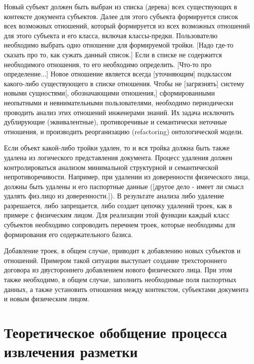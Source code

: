 \documentclass[utf8]{../IncArticle}
\newcommand{\e}[2][fcolor]{\textcolor{pcolor}{[}\textcolor{#1}{#2}\textcolor{pcolor}{]}}
\begin{document}
Новый субъект должен быть выбран из списка (дерева) всех существующих
в контексте документа субъектов.  Далее для этого субъекта формируется
список всех возможных отношений, который формируется из всех возможных
отношений для этого субъекта и его класса, включая классы-предки.
Пользователю необходимо выбрать одно отношение для формируемой тройки.
\e{Надо где-то сказать про то, как сужать данный список.}  Если в
списке не содержится необходимого отношения, то его необходимо
определить.  \e{Что-то про определение...}  Новое отношение является
всегда \e{уточняющим} подклассом какого-либо существующего в списке
отношения.  Чтобы не \e{загрязнять} систему новыми сущностями\e{,
обозначающими отношения,} сформированными неопытными и невнимательными
пользователями, необходимо периодически проводить анализ этих
отношений инженерами знаний.  Их задача исключить дублирующие (эквивалентные),
противоречивые и семантически неточные отношения, и производить
реорганизацию (refactoring) онтологической модели.

Если объект какой-либо тройки удален, то и вся тройка должна быть
также удалена из логического представления документа.  Процесс
удаления должен контролироваться анализом минимальной структурной и
семантической непротиворечивости.  Например, при удалении из
доверенности физического лица, должны быть удалены и его паспортные
данные (\e{другое дело - имеет ли смысл удалять физ.лицо из
  доверенности.}). В результате анализа либо удаление разрешается,
либо запрещается, либо создает цепочку удалений троек, как в примере с
физическим лицом.  Для реализации этой функции каждый класс субъектов
необходимо сопроводить перечнем троек, которые необходимы для
формирования его содержательного базиса.

Добавление троек, в общем случае, приводит к добавлению новых
субъектов и отношений.  Примером такой ситуации выступает создание
трехстороннего договора из двустороннего добавлением нового физического
лица.  При этом также необходимо, в общем случае, заполнить
необходимые поля паспортных данных, а также установить отношения между
контекстом, субъектами документа и новым физическим лицом.

\section{Теоретическое обобщение процесса извлечения разметки}
\end{document}
